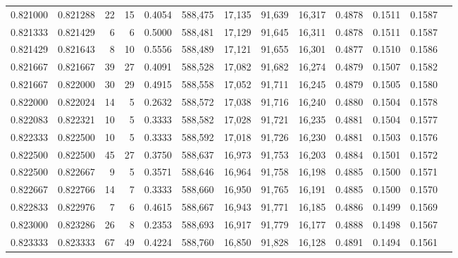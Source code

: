 \begin{tabular}{rrrrrrrrrrrrr}
0.821000 & 0.821288 &    22 &  15 &                                     0.4054 & 588,475 &  17,135 &  91,639 &  16,317 & 0.4878 & 0.1511 & 0.1587 \\
0.821333 & 0.821429 &     6 &   6 &                                     0.5000 & 588,481 &  17,129 &  91,645 &  16,311 & 0.4878 & 0.1511 & 0.1587 \\
0.821429 & 0.821643 &     8 &  10 &                                     0.5556 & 588,489 &  17,121 &  91,655 &  16,301 & 0.4877 & 0.1510 & 0.1586 \\
0.821667 & 0.821667 &    39 &  27 &                                     0.4091 & 588,528 &  17,082 &  91,682 &  16,274 & 0.4879 & 0.1507 & 0.1582 \\
0.821667 & 0.822000 &    30 &  29 &                                     0.4915 & 588,558 &  17,052 &  91,711 &  16,245 & 0.4879 & 0.1505 & 0.1580 \\
0.822000 & 0.822024 &    14 &   5 &                                     0.2632 & 588,572 &  17,038 &  91,716 &  16,240 & 0.4880 & 0.1504 & 0.1578 \\
0.822083 & 0.822321 &    10 &   5 &                                     0.3333 & 588,582 &  17,028 &  91,721 &  16,235 & 0.4881 & 0.1504 & 0.1577 \\
0.822333 & 0.822500 &    10 &   5 &                                     0.3333 & 588,592 &  17,018 &  91,726 &  16,230 & 0.4881 & 0.1503 & 0.1576 \\
0.822500 & 0.822500 &    45 &  27 &                                     0.3750 & 588,637 &  16,973 &  91,753 &  16,203 & 0.4884 & 0.1501 & 0.1572 \\
0.822500 & 0.822667 &     9 &   5 &                                     0.3571 & 588,646 &  16,964 &  91,758 &  16,198 & 0.4885 & 0.1500 & 0.1571 \\
0.822667 & 0.822766 &    14 &   7 &                                     0.3333 & 588,660 &  16,950 &  91,765 &  16,191 & 0.4885 & 0.1500 & 0.1570 \\
0.822833 & 0.822976 &     7 &   6 &                                     0.4615 & 588,667 &  16,943 &  91,771 &  16,185 & 0.4886 & 0.1499 & 0.1569 \\
0.823000 & 0.823286 &    26 &   8 &                                     0.2353 & 588,693 &  16,917 &  91,779 &  16,177 & 0.4888 & 0.1498 & 0.1567 \\
0.823333 & 0.823333 &    67 &  49 &                                     0.4224 & 588,760 &  16,850 &  91,828 &  16,128 & 0.4891 & 0.1494 & 0.1561 \\

\end{tabular}
